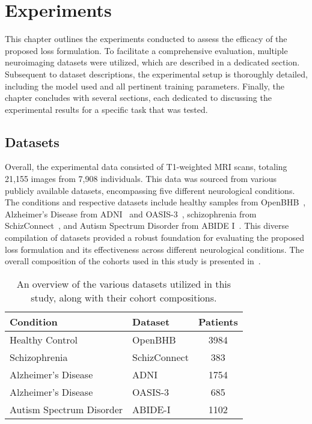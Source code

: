 \chapter{Experiments}
This chapter outlines the experiments conducted to assess the efficacy of the
proposed loss formulation. To facilitate a comprehensive evaluation, multiple
neuroimaging datasets were utilized, which are described in a dedicated section.
Subsequent to dataset descriptions, the experimental setup is thoroughly
detailed, including the model used and all pertinent training parameters.
Finally, the chapter concludes with several sections, each dedicated to
discussing the experimental results for a specific task that was tested.

\section{Datasets}
Overall, the experimental data consisted of T1-weighted MRI scans, totaling
21,155 images from 7,908 individuals. This data was sourced from various
publicly available datasets, encompassing five different neurological
conditions. The conditions and respective datasets include healthy samples from
OpenBHB~\cite{dufumier_openbhb_2022}, Alzheimer's Disease from
ADNI~\cite{petersen_alzheimer_2010} and OASIS-3~\cite{lamontagne_oasis_2019},
schizophrenia from SchizConnect~\cite{wang_schizconnect_2016}, and Autism
Spectrum Disorder from ABIDE I~\cite{ABIDE}. This diverse compilation of
datasets provided a robust foundation for evaluating the proposed loss
formulation and its effectiveness across different neurological conditions.
The overall composition of the cohorts used in this study is presented in~.
\begin{table}[h]
    \centering
    \caption[Cohorts Composition]{An overview of the various datasets utilized
    in this study, along with their cohort compositions.}
    \begin{tabular}{l l c}
    \toprule
    \textbf{Condition} & \textbf{Dataset} & \textbf{Patients}  \\
    \midrule
    Healthy Control & OpenBHB & 3984 \\
    Schizophrenia & SchizConnect & 383 \\
    Alzheimer's Disease & ADNI & 1754 \\
    Alzheimer's Disease & OASIS-3 & 685 \\
    Autism Spectrum Disorder & ABIDE-I & 1102 \\
    \bottomrule
    \end{tabular}
\end{table}

